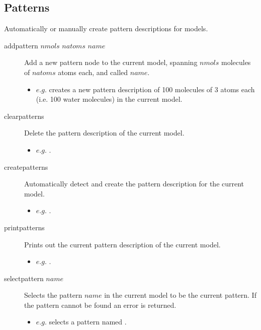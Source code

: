 \subsection{Patterns}
Automatically or manually create pattern descriptions for models.\\
\begin{description}

	\item[addpattern $nmols$ $natoms$ $name$\its] Add a new pattern node to the current model, spanning $nmols$ molecules of $natoms$ atoms each, and called $name$.
	\begin{itemize}
		\item $e.g.$  creates a new pattern description of 100 molecules of 3 atoms each (i.e. 100 water molecules) in the current model.
	\end{itemize}

	\item[clearpatterns\its] Delete the pattern description of the current model.
	\begin{itemize}
		\item $e.g.$ .
	\end{itemize}

	\item[createpatterns\its] Automatically detect and create the pattern description for the current model.
	\begin{itemize}
		\item $e.g.$ .
	\end{itemize}

	\item[printpatterns\its] Prints out the current pattern description of the current model.
	\begin{itemize}
		\item $e.g.$ .
	\end{itemize}

	\item[selectpattern $name$\its] Selects the pattern $name$ in the current model to be the current pattern. If the pattern cannot be found an error is returned.
	\begin{itemize}
		\item $e.g.$  selects a pattern named .
	\end{itemize}

\end{description}


